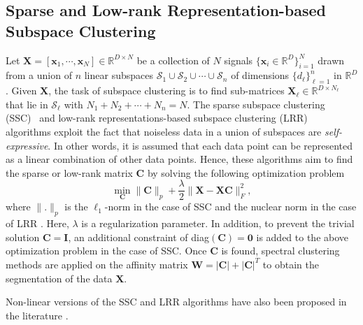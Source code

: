 \documentclass[journal]{IEEEtran}
\def\R{\mathbb R}
\begin{document}
\subsection {Sparse and Low-rank Representation-based Subspace Clustering} 
	  Let $\mathbf{X}=[\mathbf{x}_{1},\cdots,\mathbf{x}_{N}]\in \R^{D\times N}$ be a collection of $N$ signals $\{\mathbf{x}_{i}\in \R^{D}\}_{i=1}^{N}$ drawn from a union of $n$ linear subspaces $\mathcal{S}_{1} \cup \mathcal{S}_{2} \cup \cdots \cup \mathcal{S}_{n}$ of dimensions $\{d_{\ell}\}_{\ell=1}^{n}$ in $\R^{D}$.
  Given $\mathbf{X}$, the task of subspace clustering is to find sub-matrices $\mathbf{X}_{\ell}\in \R^{D\times N_{\ell}}$ that lie in $\mathcal{S}_{\ell}$ with $N_{1}+N_{2}+\cdots+N_{n}=N.$
    The sparse subspace clustering (SSC)~\cite{SSC_PAMI} and low-rank representations-based subspace clustering (LRR)~\cite{LRR_PAMI_2013} algorithms exploit the fact that noiseless data in a union of subspaces are \emph{self-expressive}.	In other words, it is assumed that each data point can be represented as a linear combination of other data points. Hence, these algorithms aim to find the sparse or low-rank matrix $\mathbf{C}$ by solving the following optimization problem	
\begin{equation}\label{eq:SSC1}
 \min_{\mathbf{C}}\|\mathbf{C}\|_{p}+\frac{\lambda}{2}\|\mathbf{X}-\mathbf{X}\mathbf{C}\|_{F}^{2},\end{equation}
where $\|.\|_{p}$ is the $\ell_{1}$-norm in the case of SSC \cite{SSC_PAMI} and the nuclear norm in the case of LRR \cite{LRR_PAMI_2013}.	Here, $\lambda$ is a regularization parameter. 	In addition, to prevent the trivial solution $\mathbf C = \mathbf I$, an additional constraint of diag$(\mathbf{C})=\mathbf{0}$ is added to the above optimization problem in the case of SSC.	  Once $\mathbf{C}$ is found, spectral clustering methods \cite{NG_spectralCluster} are applied on the affinity matrix  $\mathbf{W}=|\mathbf{C}|+|\mathbf{C}|^T$ to obtain the segmentation of the data $\mathbf{X}$.	    

Non-linear versions of the SSC and LRR algorithms have also been proposed in the literature \cite{latenst_SSC_LRR, Patel_KSSC_ICIP14}.

 
\end{document}
